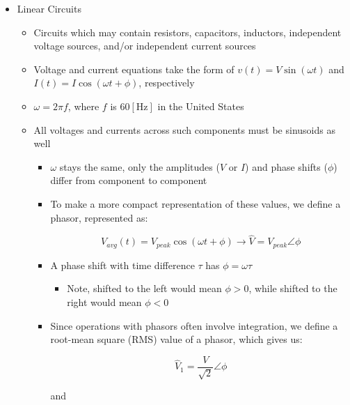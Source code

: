 \begin{itemize}

  \item Linear Circuits

    \begin{itemize}

      \item Circuits which may contain resistors, capacitors, inductors, independent voltage sources, and/or independent current sources

      \item Voltage and current equations take the form of $v(t)=V\sin(\omega t)$ and $I(t)=I\cos(\omega t + \phi)$, respectively

      \item $\omega = 2\pi f$, where $f$ is $60[\si{\hertz}]$ in the United States

      \item All voltages and currents across such components must be sinusoids as well

        \begin{itemize}

          \item $\omega$ stays the same, only the amplitudes ($V$ or $I$) and phase shifts ($\phi$) differ from component to component

          \item To make a more compact representation of these values, we define a phasor, represented as:

            $$V_{avg}(t)=V_{peak}\cos(\omega t + \phi)\to\hat{V}=V_{peak}\angle\phi$$

          \item A phase shift with time difference $\tau$ has $\phi=\omega\tau$

            \begin{itemize}

              \item Note, shifted to the left would mean $\phi>0$, while shifted to the right would mean $\phi<0$

            \end{itemize}

          \item Since operations with phasors often involve integration, we define a root-mean square (RMS) value of a phasor, which gives us:

            $$\hat{V}_1=\frac{V}{\sqrt{2}}\angle\phi$$

            \begin{center}
              and
            \end{center}


\end{itemize}
\end{itemize}
\end{itemize}
